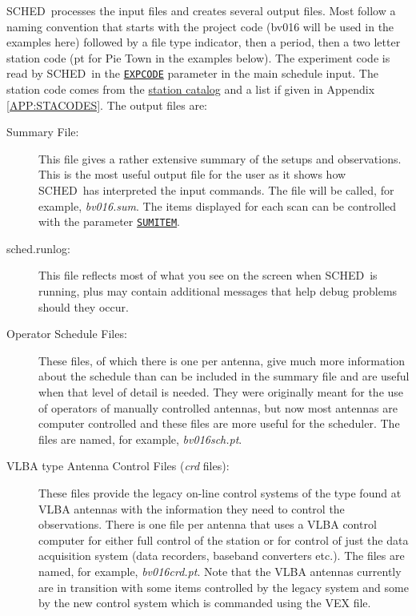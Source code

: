 \documentclass{report}
\newcommand{\schedb}{{\sc SCHED~}}
\begin{document}
\schedb processes the input files and creates several output
files.  Most follow a naming convention that starts with
the project code (bv016 will be used in the examples here) followed
by a file type indicator, then a period, then a two letter station
code (pt for Pie Town in the examples below).  The experiment code
is read by \schedb in the 
{\hyperref[MP:EXPCODE]{{\tt EXPCODE}}} parameter
in the main schedule input.  The station code comes from the
{\hyperref[SEC:STACAT]{station catalog}} and a list if given in
Appendix \ref{APP:STACODES}. The output files are:

\begin{description}

\item[Summary File:] This file gives a rather extensive summary of the
setups and observations.  This is the most useful output file for the
user as it shows how \schedb has interpreted the input commands.  The
file will be called, for example, {\sl bv016.sum}.  The items displayed
for each scan can be controlled with the parameter 
{\hyperref[MP:SUMITEM]{{\tt SUMITEM}}}.

\item[sched.runlog:] This file reflects most of what you see on the
screen when \schedb is running, plus may contain additional messages
that help debug problems should they occur.

\item[Operator Schedule Files:] These files, of which there is one per
antenna, give much more information about the schedule than can be
included in the summary file and are useful when that level of detail
is needed.  They were originally meant for the use of operators of
manually controlled antennas, but now most antennas are computer
controlled and these files are more useful for the scheduler.  The
files are named, for example, {\sl bv016sch.pt}.

\item[VLBA type Antenna Control Files ({\sl crd} files):] These files
provide the legacy on-line control systems of the type found at VLBA
antennas with the information they need to control the observations.
There is one file per antenna that uses a VLBA control computer for
either full control of the station or for control of just the data
acquisition system (data recorders, baseband converters etc.).  The
files are named, for example, {\sl bv016crd.pt}.  Note that the
VLBA antennas currently are in transition with some items controlled
by the legacy system and some by the new control system which is
commanded using the VEX file.


\end{description}
\end{document}
